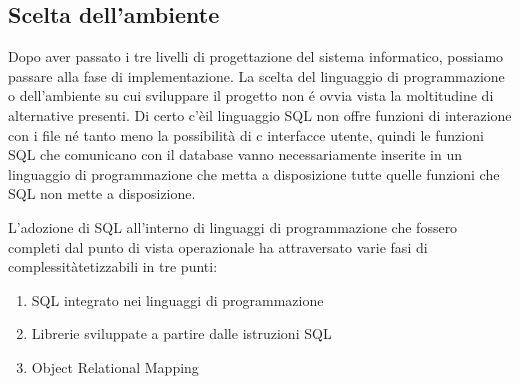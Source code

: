 \documentclass[12pt,a4paper,onecolumn]{article}
\begin{document}
	\subsection{Scelta dell'ambiente}
	\begin{flushleft}
		Dopo aver passato i tre livelli di progettazione del sistema informatico, possiamo passare alla fase di implementazione. La scelta del linguaggio di programmazione o dell'ambiente su cui sviluppare il progetto non \'{e} ovvia vista la moltitudine di alternative presenti. \newline
		Di certo c'èil linguaggio SQL non offre funzioni di interazione con i file n\'{e} tanto meno la possibilità di c interfacce utente, quindi le funzioni SQL che comunicano con il database vanno necessariamente inserite in un linguaggio di programmazione che metta a disposizione tutte quelle funzioni che SQL non mette a disposizione.\newline
		
		L'adozione di SQL all'interno di linguaggi di programmazione che fossero completi dal punto di vista operazionale ha attraversato varie fasi di complessitàtetizzabili in tre punti:
	\end{flushleft}
	\begin{enumerate}
		\item SQL integrato nei linguaggi di programmazione
		\item Librerie sviluppate a partire dalle istruzioni SQL
		\item Object Relational Mapping
	\end{enumerate}
\end{document}
